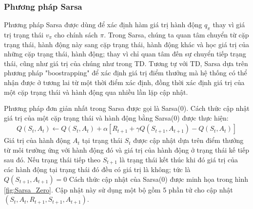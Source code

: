 \subsubsection{Phương pháp Sarsa}
Phương pháp Sarsa được dùng để xác định hàm giá trị hành động $q_{\pi}$ thay vì giá trị trạng thái $v_{\pi}$ cho chính sách $\pi$. Trong Sarsa, chúng ta quan tâm chuyển từ cặp trạng thái, hành động này sang cặp trạng thái, hành động khác và học giá trị của những cặp trạng thái, hành động; thay vì chỉ quan tâm đến sự chuyển tiếp trạng thái, cũng như giá trị của chúng như trong TD. Tương tự với TD, Sarsa dựa trên phương pháp "boostrapping" để xác định giá trị điểm thưởng mà hệ thống có thể nhận được ở tương lai từ một thời điểm xác định, đồng thời xác định giá trị của một cặp trạng thái và hành động qua nhiều lần lặp cập nhật.

Phương pháp đơn giản nhất trong Sarsa được gọi là Sarsa(0). Cách thức cập nhật giá trị của một cặp trạng thái và hành động bằng Sarsa(0) được thực hiện:
\begin{align}
Q(\mathit{S}_t, \mathit{A}_t) \leftarrow Q(\mathit{S}_t, \mathit{A}_t) + \alpha \left[\mathit{R}_{t+1} + \gamma Q(\mathit{S}_{t+1}, \mathit{A}_{t+1}) -  Q(\mathit{S}_t, \mathit{A}_t) \right]
\label{eq:Sarsa_action_update}
\end{align}
Giá trị của hành động $\mathit{A}_t$ tại trạng thái $\mathit{S}_t$ được cập nhật dựa trên điểm thưởng từ môi trường ứng với hành động đó và giá trị của hành động ở trạng thái kế tiếp sau đó. Nếu trạng thái tiếp theo $\mathit{S}_{t+1}$ là trạng thái kết thúc khi đó giá trị của các hành động tại trạng thái đó đều có giá trị là không; tức là $Q(\mathit{S}_{t+1}, \mathit{A}_{t+1}) = 0$
Cách thức cập nhật của Sarsa(0) được minh họa trong hình \ref{fig:Sarsa_Zero}.
Cập nhật này sử dụng một bộ gồm 5 phần tử cho cập nhật $(\mathit{S}_t, \mathit{A}_t, \mathit{R}_{t+1}, \mathit{S}_{t+1}, \mathit{A}_{t+1})$.

